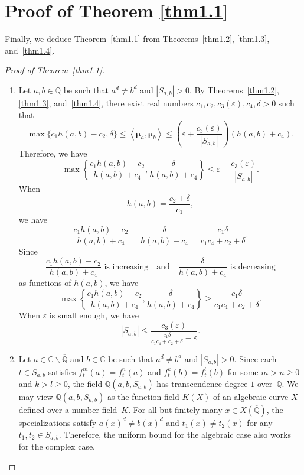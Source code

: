 \documentclass[11pt]{amsart}
\numberwithin{equation}{section}
\theoremstyle{plain}
\theoremstyle{definition}
\theoremstyle{remark}
\newcommand{\C}{\mathbb C}
\newcommand{\Q}{\mathbb Q}
\renewcommand{\bar}{\overline}
\begin{document}
\section{Proof of Theorem \texorpdfstring{\ref{thm1.1}}{1.1}}\label{sec5}

Finally, we deduce Theorem~\ref{thm1.1} from Theorems~\ref{thm1.2},
\ref{thm1.3}, and~\ref{thm1.4}.

\begin{proof}[Proof of Theorem~\ref{thm1.1}]\leavevmode
  \begin{enumerate}[wide]
    \item Let $a,b\in\bar{\Q}$ be 
such that $a^{d}\neq b^{d}$ and $|S_{a,b}|>0$. By Theorems~\ref{thm1.2},
\ref{thm1.3}, and~\ref{thm1.4}, there exist real numbers
$c_{1},c_{2},c_{3}(\varepsilon),c_{4},\delta>0$
such that
\[
\max\{c_{1}h(a,b)-c_{2},\delta\}\leq\left\langle \boldsymbol{\mu}_{a},\boldsymbol{\mu}_{b}\right\rangle \leq\left(\varepsilon+\frac{c_{3}(\varepsilon)}{|S_{a,b}|}\right)(h(a,b)+c_{4}).
\]
Therefore, we have
\[
\max\left\{ \frac{c_{1}h(a,b)-c_{2}}{h(a,b)+c_{4}},\frac{\delta}{h(a,b)+c_{4}}\right\} \leq\varepsilon+\frac{c_{3}(\varepsilon)}{|S_{a,b}|}.
\]
When
\[
h(a,b)=\frac{c_{2}+\delta}{c_{1}},
\]
we have
\[
\frac{c_{1}h(a,b)-c_{2}}{h(a,b)+c_{4}}=\frac{\delta}{h(a,b)+c_{4}}=\frac{c_{1}\delta}{c_{1}c_{4}+c_{2}+\delta}.
\]
Since
\[
\frac{c_{1}h(a,b)-c_{2}}{h(a,b)+c_{4}}\text{ is increasing}\quad\text{and}\quad\frac{\delta}{h(a,b)+c_{4}}\text{ is decreasing}
\]
as functions of $h(a,b)$, we have
\[
\max\left\{ \frac{c_{1}h(a,b)-c_{2}}{h(a,b)+c_{4}},\frac{\delta}{h(a,b)+c_{4}}\right\} \geq\frac{c_{1}\delta}{c_{1}c_{4}+c_{2}+\delta}.
\]
When $\varepsilon$ is small enough, we have
\[
|S_{a,b}|\leq\frac{c_{3}(\varepsilon)}{\frac{c_{1}\delta}{c_{1}c_{4}+c_{2}+\delta}-\varepsilon}.
\]

\item Let $a\in\C\backslash\bar{\Q}$ and $b\in\C$ be 
such that $a^{d}\neq b^{d}$ and $|S_{a,b}|>0$. Since each $t\in S_{a,b}$
satisfies $f_{t}^{m}(a)=f_{t}^{n}(a)$ and $f_{t}^{k}(b)=f_{t}^{l}(b)$
for some $m>n\geq0$ and $k>l\geq0$, the field $\Q(a,b,S_{a,b})$
has transcendence degree $1$ over~$\Q$. We may view $\Q(a,b,S_{a,b})$
as the function field $K(X)$ of an algebraic curve $X$ defined over
a number field~$K$. For all but finitely many $x\in X(\bar{\Q})$,
the specializations satisfy $a(x)^{d}\neq b(x)^{d}$ and $t_{1}(x)\neq t_{2}(x)$
for any $t_{1},t_{2}\in S_{a,b}$. Therefore, the uniform bound for
the algebraic case also works for the complex case.
\hfill\qedhere
\end{enumerate}
\end{proof}
\end{document}
